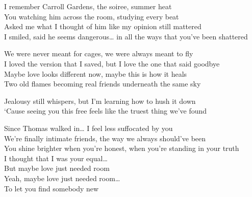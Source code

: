 \begin{lyrics}
I remember Carroll Gardens, the soiree, summer heat\\
You watching him across the room, studying every beat\\
Asked me what I thought of him like my opinion still mattered\\
I smiled, said he seems dangerous… in all the ways that you’ve been shattered

We were never meant for cages, we were always meant to fly\\
I loved the version that I saved, but I love the one that said goodbye\\
Maybe love looks different now, maybe this is how it heals\\
Two old flames becoming real friends underneath the same sky

Jealousy still whispers, but I’m learning how to hush it down\\
‘Cause seeing you this free feels like the truest thing we’ve found

Since Thomas walked in… I feel less suffocated by you\\
We’re finally intimate friends, the way we always should’ve been\\
You shine brighter when you’re honest, when you’re standing in your truth\\
I thought that I was your equal…\\
But maybe love just needed room\\
Yeah, maybe love just needed room…\\
To let you find somebody new

\end{lyrics}

